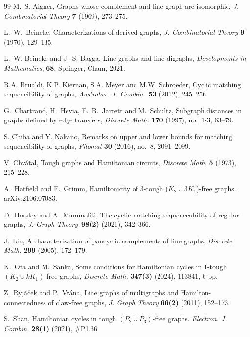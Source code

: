 \documentclass[12pt]{article}
\theoremstyle{definition}
\begin{document}
\begin{thebibliography}{99}
M.~S. Aigner, Graphs whose complement and line graph are isomorphic, 
 \emph{J. Combinatorial Theory} {\bf 7} (1969), 273--275.
 
L.~W.~Beineke, Characterizations of derived graphs, 
{\em J. Combinatorial Theory} {\bf 9} (1970), 129--135.

L.~W. Beineke and J.~S. Bagga,  Line graphs and line digraphs, 
{\em Developments in Mathematics}, {\bf 68}, Springer, Cham, 2021.


R.A. Brualdi, K.P. Kiernan, S.A. Meyer and M.W. Schroeder,
Cyclic matching sequencibility of graphs,
{\em Australas.\ J. Combin.}~{\bf 53} (2012), 245--256.

G.~Chartrand, H.~Hevia, E.~B.~Jarrett and M.~Schultz, 
Subgraph distances in graphs defined by edge transfers, {\em Discrete Math.} {\bf 170} (1997), no.~1-3, 63--79.

S. Chiba and Y. Nakano, Remarks on upper and lower bounds for matching sequencibility of graphs, 
{\em Filomat} {\bf 30} (2016), no.~8, 2091--2099.

V. Chv\'atal, Tough graphs and Hamiltonian circuits, 
{\em Discrete Math.} {\bf 5} (1973), 215--228.

A.~Hatfield and E.~Grimm,
 Hamiltonicity of 3-tough ($K_2\cup 3K_1$)-free graphs. 
 arXiv:2106.07083.
 
D.~Horsley and A.~Mammoliti, 
  {The cyclic matching sequenceability of regular graphs}, 
  {\em J. Graph Theory}~{\bf 98(2)} (2021), 342--366. 

J.~Liu,
A characterization of pancyclic complements
of line graphs,
{\em Discrete Math.} {\bf 299} (2005), 172--179.

K.~Ota and M.~Sanka,
Some conditions for Hamiltonian cycles in 1-tough  $(K_2\cup kK_1)$-free graphs,
{\em Discrete Math.} {\bf 347(3)} (2024), 113841, 6 pp.

Z.~Ryj\'a\v cek and P.~Vr\'ana, Line graphs of multigraphs and Hamilton-connectedness of claw-free graphs, {\em J. Graph Theory} {\bf 66(2)} (2011), 152--173.

 S.~Shan,
Hamiltonian cycles in tough $(P_2 \cup P_3)$-free graphs.
{\em Electron. J. Combin.} {\bf 28(1)} (2021), \#P1.36 


\end{thebibliography}
\end{document}
